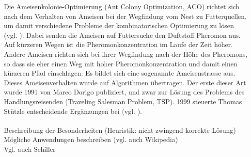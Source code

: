 Die Ameisenkolonie-Optimierung (Ant Colony Optimization, ACO) richtet sich nach dem Verhalten von Ameisen bei der Wegfindung vom Nest zu Futterquellen, um damit verschiedene Probleme der kombinatorischen Optimierung zu lösen (vgl. \cite[S. 1]{sch-koa}). Dabei senden die Ameisen auf Futtersuche den Duftstoff Pheromon aus. Auf kürzeren Wegen ist die Pheromonkonzentration im Laufe der Zeit höher. Andere Ameisen richten sich bei ihrer Wegfindung nach der Höhe des Pheromons, so dass sie eher einen Weg mit hoher Pheromonkonzentration und damit einen kürzeren Pfad einschlagen. Es bildet sich eine sogenannte Ameisenstrasse aus.
Dieses Ameisenverhalten wurde auf Algorithmen übertragen. Der erste dieser Art wurde 1991 von Marco Dorigo publiziert, und zwar zur Lösung des Problems des Handlungsreisenden (Traveling Salesman Problem, TSP). 1999 steuerte Thomas Stützle entscheidende Ergänzungen bei (vgl. \cite{ds-ant; wiki-antalg}). \\\\

Beschreibung der Besonderheiten (Heuristik: nicht zwingend korrekte Lösung) \\

Mögliche Anwendungen beschreiben (vgl. auch Wikipedia) \\

Vgl. auch Schiller


\vspace*{1cm}
